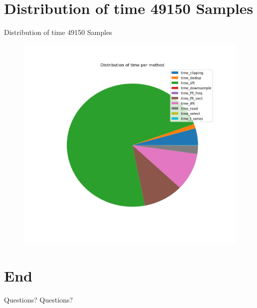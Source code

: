 \documentclass{beamer}
\begin{document}
\section{Distribution of time 49150 Samples}
\begin{frame}{Distribution of time 49150 Samples}
	\begin{figure}
		\includegraphics[width=.8\textwidth]{piechart_49150}
	\end{figure}
\end{frame}


\section{End}
\begin{frame}{Questions?}
	Questions?
\end{frame}
\end{document}
